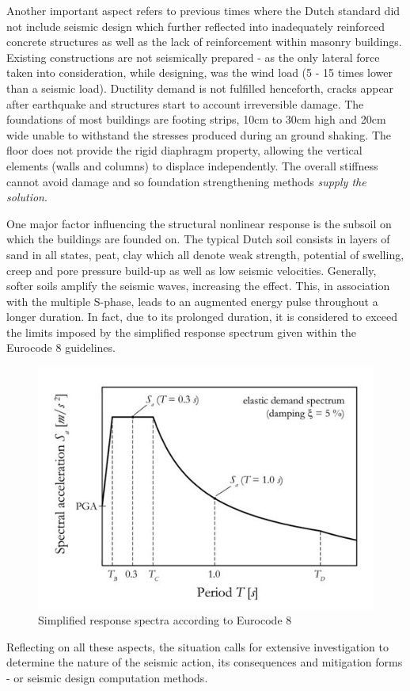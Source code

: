 \documentclass[12pt,a4paper]{report}
\begin{document}
Another important aspect refers to previous times where the Dutch standard did not include seismic design which further reflected into inadequately reinforced concrete structures as well as the lack of reinforcement within masonry buildings. Existing constructions are not seismically prepared - as the only lateral force taken into consideration, while designing, was the wind load (5 - 15 times lower than a seismic load). Ductility demand is not fulfilled henceforth, cracks appear after earthquake and structures start to account irreversible damage.  The foundations of most buildings are footing strips, 10cm to 30cm high and 20cm wide unable to withstand the stresses produced during an ground shaking. The floor does not provide the rigid diaphragm property, allowing the vertical elements (walls and columns) to displace independently. The overall stiffness cannot avoid damage and so foundation strengthening methods \textit{supply the solution}. 

One major factor influencing the structural nonlinear response is the subsoil on which the buildings are founded on. The typical Dutch soil consists in layers of sand in all states, peat, clay which all denote weak strength, potential of swelling, creep and pore pressure build-up as well as low seismic velocities. Generally, softer soils amplify the seismic waves, increasing the effect. This, in association with the multiple S-phase, leads to an augmented energy pulse throughout a longer duration. In fact, due to its prolonged duration, it is considered to exceed the limits imposed by the simplified response spectrum given within the Eurocode 8 guidelines.
\begin{figure}[h!]
	\centering
	\includegraphics[width=0.42\linewidth]{"spectrum_code"}
	\caption{Simplified response spectra according to Eurocode 8}
	\label{SA}
\end{figure}

Reflecting on all these aspects, the situation calls for extensive investigation to determine the nature of the seismic action, its consequences and mitigation forms - or seismic design computation methods. 
\end{document}
